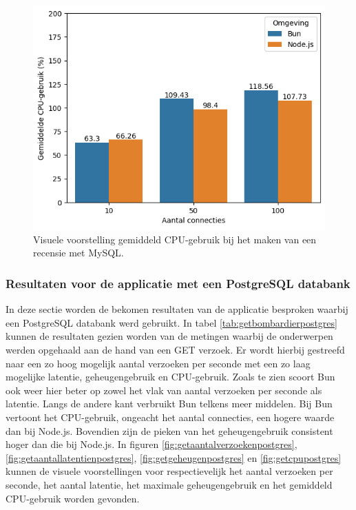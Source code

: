     \begin{figure}[H]
      \centering
      \includegraphics[width=0.7\columnwidth]{graphics/PostMySqlCpu.png}
      \caption[CPU-gebruik POST verzoek met MySQL]{\label{fig:postcpumysql}Visuele voorstelling gemiddeld CPU-gebruik bij het maken van een recensie met MySQL.}
    \end{figure}
\subsubsection{Resultaten voor de applicatie met een PostgreSQL databank}
In deze sectie worden de bekomen resultaten van de applicatie besproken waarbij een PostgreSQL databank werd gebruikt.
In tabel \ref{tab:getbombardierpostgres} kunnen de resultaten gezien worden van de metingen waarbij de onderwerpen werden opgehaald aan de hand van een GET verzoek.
Er wordt hierbij gestreefd naar een zo hoog mogelijk aantal verzoeken per seconde met een zo laag mogelijke latentie, geheugengebruik en CPU-gebruik.
Zoals te zien scoort Bun ook weer hier beter op zowel het vlak van aantal verzoeken per seconde als latentie.
Langs de andere kant verbruikt Bun telkens meer middelen. Bij Bun vertoont het CPU-gebruik, ongeacht het aantal connecties, een hogere waarde dan bij Node.js.
Bovendien zijn de pieken van het geheugengebruik consistent hoger dan die bij Node.js.
In figuren \ref{fig:getaantalverzoekenpostgres}, \ref{fig:getaantallatentienpostgres}, \ref{fig:getgeheugenpostgres} en \ref{fig:getcpupostgres} kunnen de visuele voorstellingen 
voor respectievelijk het aantal verzoeken per seconde, het aantal latentie, het maximale geheugengebruik en het gemiddeld CPU-gebruik worden gevonden.

